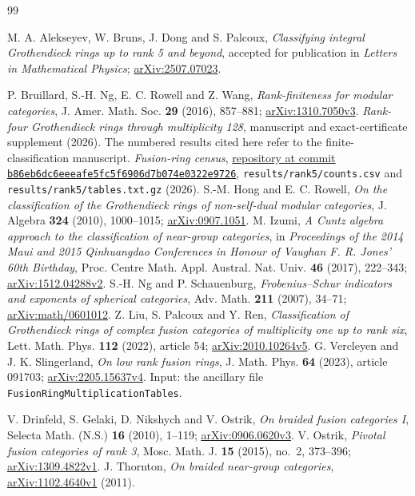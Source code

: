 \begin{thebibliography}{99}
\raggedright
\small
{} M. A. Alekseyev, W. Bruns, J. Dong and S. Palcoux,
\emph{Classifying integral Grothendieck rings up to rank 5 and beyond},
accepted for publication in \emph{Letters in Mathematical Physics};
\href{https://arxiv.org/abs/2507.07023}{arXiv:2507.07023}.

 P. Bruillard, S.-H. Ng, E. C. Rowell and Z. Wang,
\emph{Rank-finiteness for modular categories}, J. Amer. Math. Soc.
\textbf{29} (2016), 857--881;
\href{https://arxiv.org/abs/1310.7050v3}{arXiv:1310.7050v3}.
 \emph{Rank-four Grothendieck rings through multiplicity 128},
manuscript and exact-certificate supplement (2026).
The numbered results cited here refer to the finite-classification manuscript.
 \emph{Fusion-ring census},
\href{https://github.com/sebastienpalcoux/fusion-ring-census/tree/b86eb6dc6eeeafe5fc5f6906d7b074e0322e9726}{repository at commit \texttt{b86eb6dc6eeeafe5fc5f6906d7b074e0322e9726}},
\texttt{results/rank5/counts.csv} and
\texttt{results/rank5/tables.txt.gz} (2026).
 S.-M. Hong and E. C. Rowell,
\emph{On the classification of the Grothendieck rings of non-self-dual
modular categories}, J. Algebra \textbf{324} (2010), 1000--1015;
\href{https://arxiv.org/abs/0907.1051}{arXiv:0907.1051}.
 M. Izumi,
\emph{A Cuntz algebra approach to the classification of near-group categories},
in \emph{Proceedings of the 2014 Maui and 2015 Qinhuangdao Conferences
in Honour of Vaughan F. R. Jones' 60th Birthday},
Proc. Centre Math. Appl. Austral. Nat. Univ. \textbf{46} (2017), 222--343;
\href{https://arxiv.org/abs/1512.04288v2}{arXiv:1512.04288v2}.
 S.-H. Ng and P. Schauenburg,
\emph{Frobenius--Schur indicators and exponents of spherical categories},
Adv. Math. \textbf{211} (2007), 34--71;
\href{https://arxiv.org/abs/math/0601012}{arXiv:math/0601012}.
 Z. Liu, S. Palcoux and Y. Ren,
\emph{Classification of Grothendieck rings of complex fusion categories
of multiplicity one up to rank six}, Lett. Math. Phys. \textbf{112}
(2022), article 54;
\href{https://arxiv.org/abs/2010.10264v5}{arXiv:2010.10264v5}.
 G. Vercleyen and J. K. Slingerland,
\emph{On low rank fusion rings}, J. Math. Phys. \textbf{64} (2023),
article 091703;
\href{https://arxiv.org/abs/2205.15637v4}{arXiv:2205.15637v4}.
Input: the ancillary file \texttt{FusionRingMultiplicationTables}.

 V. Drinfeld, S. Gelaki, D. Nikshych and V. Ostrik,
\emph{On braided fusion categories I}, Selecta Math. (N.S.)
\textbf{16} (2010), 1--119;
\href{https://arxiv.org/abs/0906.0620v3}{arXiv:0906.0620v3}.
 V. Ostrik,
\emph{Pivotal fusion categories of rank 3}, Mosc. Math. J.
\textbf{15} (2015), no.~2, 373--396;
\href{https://arxiv.org/abs/1309.4822v1}{arXiv:1309.4822v1}.
 J. Thornton, \emph{On braided near-group categories},
\href{https://arxiv.org/abs/1102.4640v1}{arXiv:1102.4640v1} (2011).
\end{thebibliography}
